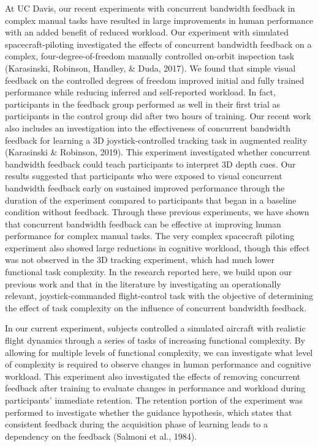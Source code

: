 At UC Davis, our recent experiments with concurrent bandwidth feedback in complex manual tasks have resulted in large improvements in human performance with an added benefit of reduced workload.
Our experiment with simulated spacecraft-piloting investigated the effects of concurrent bandwidth feedback on a complex, four-degree-of-freedom manually controlled on-orbit inspection task (Karasinski, Robinson, Handley, \& Duda, 2017).
We found that simple visual feedback on the controlled degrees of freedom improved initial and fully trained performance while reducing inferred and self-reported workload.
In fact, participants in the feedback group performed as well in their first trial as participants in the control group did after two hours of training.
Our recent work also includes an investigation into the effectiveness of concurrent bandwidth feedback for learning a 3D joystick-controlled tracking task in augmented reality (Karasinski \& Robinson, 2019).
This experiment investigated whether concurrent bandwidth feedback could teach participants to interpret 3D depth cues.
Our results suggested that participants who were exposed to visual concurrent bandwidth feedback early on sustained improved performance through the duration of the experiment compared to participants that began in a baseline condition without feedback.
Through these previous experiments, we have shown that concurrent bandwidth feedback can be effective at improving human performance for complex manual tasks.
The very complex spacecraft piloting experiment also showed large reductions in cognitive workload, though this effect was not observed in the 3D tracking experiment, which had much lower functional task complexity.
In the research reported here, we build upon our previous work and that in the literature by investigating an operationally relevant, joystick-commanded flight-control task with the objective of determining the effect of task complexity on the influence of concurrent bandwidth feedback.

In our current experiment, subjects controlled a simulated aircraft with realistic flight dynamics through a series of tasks of increasing functional complexity.
By allowing for multiple levels of functional complexity, we can investigate what level of complexity is required to observe changes in human performance and cognitive workload.
This experiment also investigated the effects of removing concurrent feedback after training to evaluate changes in performance and workload during participants' immediate retention.
The retention portion of the experiment was performed to investigate whether the guidance hypothesis, which states that consistent feedback during the acquisition phase of learning leads to a dependency on the feedback (Salmoni et al., 1984).

